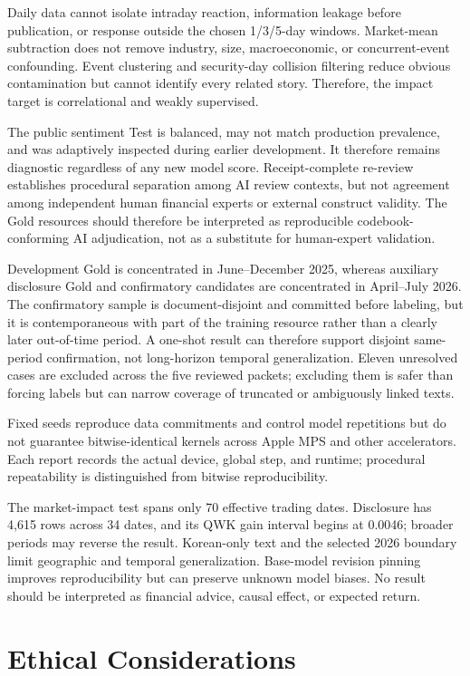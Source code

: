 \documentclass[11pt]{article}
\begin{document}
Daily data cannot isolate intraday reaction, information leakage before publication, or response outside the chosen 1/3/5-day windows. Market-mean subtraction does not remove industry, size, macroeconomic, or concurrent-event confounding. Event clustering and security-day collision filtering reduce obvious contamination but cannot identify every related story. Therefore, the impact target is correlational and weakly supervised.

The public sentiment Test is balanced, may not match production prevalence, and was adaptively inspected during earlier development. It therefore remains diagnostic regardless of any new model score. Receipt-complete re-review establishes procedural separation among AI review contexts, but not agreement among independent human financial experts or external construct validity. The Gold resources should therefore be interpreted as reproducible codebook-conforming AI adjudication, not as a substitute for human-expert validation.

Development Gold is concentrated in June--December 2025, whereas auxiliary disclosure Gold and confirmatory candidates are concentrated in April--July 2026. The confirmatory sample is document-disjoint and committed before labeling, but it is contemporaneous with part of the training resource rather than a clearly later out-of-time period. A one-shot result can therefore support disjoint same-period confirmation, not long-horizon temporal generalization. Eleven unresolved cases are excluded across the five reviewed packets; excluding them is safer than forcing labels but can narrow coverage of truncated or ambiguously linked texts.

Fixed seeds reproduce data commitments and control model repetitions but do not guarantee bitwise-identical kernels across Apple MPS and other accelerators. Each report records the actual device, global step, and runtime; procedural repeatability is distinguished from bitwise reproducibility.

The market-impact test spans only 70 effective trading dates. Disclosure has 4,615 rows across 34 dates, and its QWK gain interval begins at 0.0046; broader periods may reverse the result. Korean-only text and the selected 2026 boundary limit geographic and temporal generalization. Base-model revision pinning improves reproducibility but can preserve unknown model biases. No result should be interpreted as financial advice, causal effect, or expected return.

\section*{Ethical Considerations}
\end{document}
